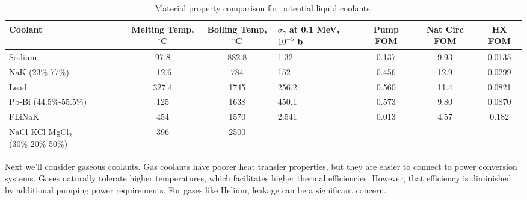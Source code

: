 \documentclass[]{report}
\begin{document}
\begin{table} \label{tab:coolant_properties}
\hspace*{-2cm} %
\begin{tabular}{|p{2.8cm}|c|c|p{2.5cm}|c|c|c|}
%
%
\hline
Coolant & Melting Temp, $^{\circ}$C & Boiling Temp, $^{\circ}$C & $\sigma_\gamma $ at 0.1 MeV, $10^{-5}$ b & Pump FOM & Nat Circ FOM & HX FOM \\
\hline
Sodium & 97.8 & 882.8 & 1.32 & 0.137 & 9.93 & 0.0135 \\
\hline
NaK (23\%-77\%) & -12.6 & 784 & 152 & 0.456 & 12.9 & 0.0299\\
\hline
Lead & 327.4 & 1745 & 256.2 & 0.560 & 11.4 & 0.0821\\
\hline
Pb-Bi (44.5\%-55.5\%) & 125 & 1638 & 450.1 & 0.573 & 9.80 & 0.0870\\
\hline
FLiNaK & 454 & 1570 & 2.541 & 0.013 & 4.57 & 0.182\\
\hline
NaCl-KCl-MgCl$_2$ (30\%-20\%-50\%) & 396 & 2500 &  &  &  & \\
\hline
\end{tabular}
\caption{Material property comparison for potential liquid coolants.\cite{IAEA_1}}
\end{table}

Next we'll consider gaseous coolants. Gas coolants have poorer heat transfer properties, but they are easier to connect to power conversion systems. Gases naturally tolerate higher temperatures, which facilitates higher thermal efficiencies. However, that efficiency is diminished by additional pumping power requirements.
For gases like Helium, leakage can be a significant concern. 
\end{document}
